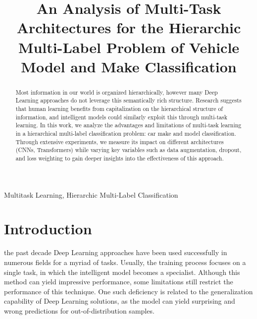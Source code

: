 \documentclass[conference]{IEEEtran}
\begin{document}
\title{An Analysis of Multi-Task Architectures for the Hierarchic Multi-Label Problem of Vehicle Model and Make Classification}

\author{}

\author{
}


\maketitle

\begin{abstract}
Most information in our world is organized hierarchically, however many Deep Learning approaches do not leverage this semantically rich structure. Research suggests that human learning benefits from capitalization on the hierarchical structure of information, and intelligent models could similarly exploit this through multi-task learning. In this work, we analyze the advantages and limitations of multi-task learning in a hierarchical multi-label classification problem: car make and model classification. Through extensive experiments, we measure its impact on different architectures (CNNs, Transformers) while varying key variables such as data augmentation, dropout, and loss weighting to gain deeper insights into the effectiveness of this approach.
\end{abstract}

\begin{IEEEkeywords}
Multitask Learning, Hierarchic Multi-Label Classification 
\end{IEEEkeywords}

\section{Introduction}
\label{sec:intro}

 the past decade Deep Learning approaches have been used successfully in numerous fields for a myriad of tasks. Usually, the training process focuses on a single task, in which the intelligent model becomes a specialist. Although this method can yield impressive performance, some limitations still restrict the performance of this technique. One such deficiency is related to the generalization capability of Deep Learning solutions, as the model can yield surprising and wrong predictions for out-of-distribution samples. 
\end{document}

